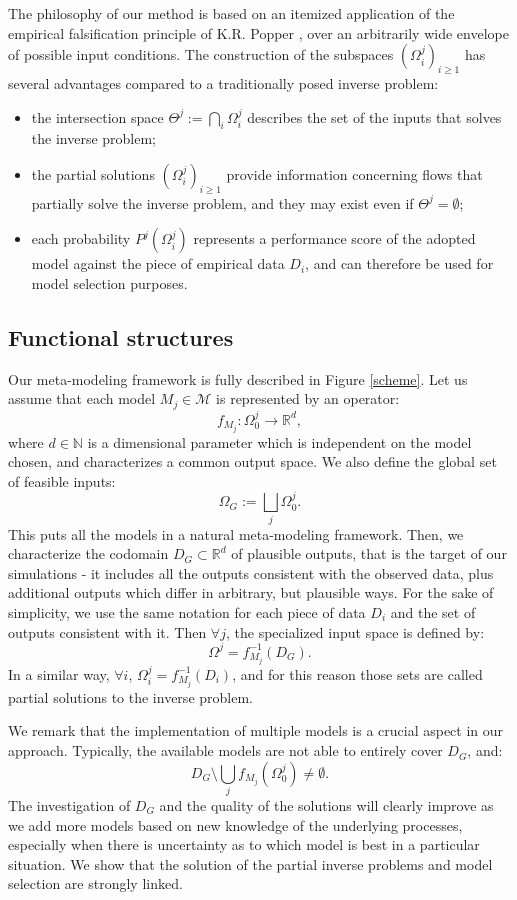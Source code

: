 \documentclass[nhess, manuscript]{copernicus}
\begin{document}
The philosophy of our method is based on an itemized application of the empirical falsification principle of K.R. Popper \citep{Popper1959}, over an arbitrarily wide envelope of possible input conditions. The construction of the subspaces $(\Omega^j_i)_{i\ge1}$ has several advantages compared to a traditionally posed inverse problem:
\begin{itemize}
  \item the intersection space $\Theta^j:=\bigcap_i \Omega^j_i$ describes the set of the inputs that solves the inverse problem;
  \item the partial solutions $(\Omega^j_i)_{i\ge1}$ provide information concerning flows that partially solve the inverse problem, and they may exist even if $\Theta^j=\emptyset$;
  \item each probability $P^j(\Omega^j_i)$ represents a performance score of the adopted model against the piece of empirical data $D_i$, and can therefore be used for model selection purposes.
\end{itemize}

\subsection{Functional structures}
Our meta-modeling framework is fully described in Figure \ref{scheme}. Let us assume that each model $M_j\in\mathcal M$ is represented by an operator:
$$f_{M_j}: \Omega^j_0 \longrightarrow \mathbb R^d,$$
where $d\in\mathbb N$ is a dimensional parameter which is independent on the model chosen, and characterizes a common output space. We also define the global set of feasible inputs:
$$\Omega_G:=\bigsqcup_j \Omega^j_0.$$
This puts all the models in a natural meta-modeling framework. Then, we characterize the codomain $D_G\subset \mathbb R^d$ of plausible outputs, that is the target of our simulations - it includes all the outputs consistent with the observed data, plus additional outputs which differ in arbitrary, but plausible ways. For the sake of simplicity, we use the same notation for each piece of data $D_i$ and the set of outputs consistent with it. Then $\forall j$, the specialized input space is defined by:
$$\Omega^j=f_{M_j}^{-1}\left(D_G\right).$$
In a similar way, $\forall i$, $\Omega^j_i=f_{M_j}^{-1}\left(D_i\right)$, and for this reason those sets are called partial solutions to the inverse problem.

We remark that the implementation of multiple models is a crucial aspect in our approach. Typically, the available models are not able to entirely cover $D_G$, and:
$$D_G\setminus\bigcup_j f_{M_j}\left(\Omega^j_0\right)\neq \emptyset.$$
The investigation of $D_G$ and the quality of the solutions will clearly improve as we add more models based on new knowledge of the underlying processes, especially when there is uncertainty as to which model is best in a particular situation. We show that the solution of the partial inverse problems and model selection are strongly linked.
\end{document}
